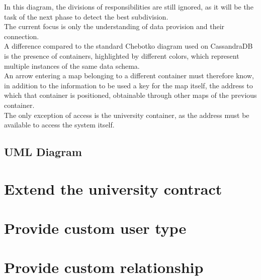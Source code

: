\documentclass[ManualeSviluppatore.tex]{subfiles}
\begin{document}
In this diagram, the divisions of responsibilities are still ignored, as it will be the task of the next phase to detect the best subdivision.\\
The current focus is only the understanding of data provision and their connection.\\

A difference compared to the standard Chebotko diagram used on CassandraDB is the presence of containers, highlighted by different colors, which represent multiple instances of the same data schema.\\
An arrow entering a map belonging to a different container must therefore know, in addition to the information to be used a key for the map itself, the address to which that container is positioned, obtainable through other maps of the previous container.\\
The only exception of access is the university container, as the address must be available to access the system itself.\\

\subsection{UML Diagram}

\section{Extend the university contract}
\section{Provide custom user type}
\section{Provide custom relationship}
\end{document}
